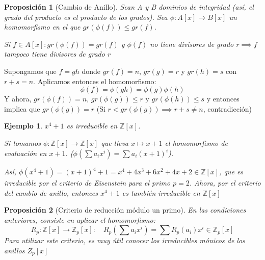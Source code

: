 \documentclass[11pt, a4paper, titlepage]{article}
\makeatletter
\renewenvironment{proof}[1][\proofname] {\vspace{-15pt}\par\pushQED{\qed}\normalfont\topsep6\p@\@plus6\p@\relax\trivlist\item[\hskip\labelsep\it#1\@addpunct{.}]\ignorespaces}{\popQED\endtrivlist\@endpefalse}
\providecommand{\ent}{\mathbb{Z}}
\theoremstyle{theorem-style}
\newtheorem*{nprop}{Proposición}
\theoremstyle{definition-style}
\theoremstyle{remark-style}
\theoremstyle{example-style}
\newtheorem*{ejemplo}{Ejemplo}
\makeatother
\begin{document}
\begin{nprop}[Cambio de Anillo]
	Sean A y B dominios de integridad (así, el grado del producto es el producto de los grados). Sea $\phi : A[x] \to B[x]$ un homomorfismo en el que $gr(\phi(f))  \leq gr(f)$.
	
	Si $f\in A[x] : gr(\phi(f))= gr(f)$ y $\phi(f)$ no tiene divisores de grado $r \implies f$ tampoco tiene divisores de grado $r$ 
\end{nprop}
\begin{proof}
	Supongamos que $f=gh$ donde $gr(f) = n$, $gr(g) = r$ y $gr(h) = s$ con $r+s = n$.
	Aplicamos entonces el homomorfismo:
	\[
	\phi(f) = \phi(gh) = \phi(g)\phi(h)
	\]
	Y ahora, $gr(\phi(f)) = n$, $gr(\phi(g)) \leq r$ y $gr(\phi(h)) \leq s$ y entonces implica que $gr(\phi(g)) = r$ (Si $r < gr(\phi(g)) \implies r+s \neq n$, contradicción)
\end{proof}
\begin{ejemplo}
	$x^4+1$ es irreducible en $\ent[x]$.
	
	Si tomamos $\phi:\ent[x] \to \ent[x]$ que lleva $x \mapsto x+1$ el homomorfismo de evaluación en $x+1$. ($\phi(\sum a_i x^i) = \sum a_i (x+1)^i$).
	
	Así, $\phi(x^4+1) = (x+1)^4+1 = x^4 +4x^3 +6x^2 +4x + 2 \in \ent[x]$, que es irreducible por el criterio de Eisenstein para el primo $p=2$. Ahora, por el criterio del cambio de anillo, entonces $x^4+1$ es también irreducible en $\ent[x]$
\end{ejemplo}

\begin{nprop}[Criterio de reducción módulo un primo]
	En las condiciones anteriores, consiste en aplicar el homomorfismo:
	\[
	R_p:\ent[x] \to \ent_p[x] : \quad R_p(\sum a_i x^i) =  \sum R_p(a_i) x^i \in \ent_p[x]
	\]
	Para utilizar este criterio, es muy útil conocer los irreducibles mónicos de los anillos $Z_p[x]$
\end{nprop}
\end{document}
